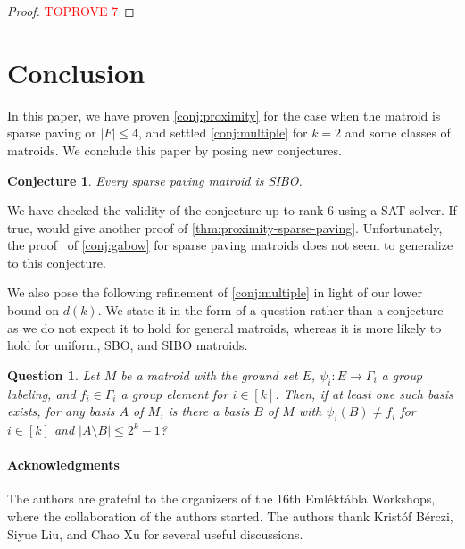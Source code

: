 \documentclass{article}
\newtheorem{conjecture}[theorem]{Conjecture}
\newtheorem{question}[theorem]{Question}
\theoremstyle{definition}
\begin{document}
\begin{proof}\textcolor{red}{TOPROVE 7}\end{proof}


\section{Conclusion}\label{sec:conclusion}

In this paper, we have proven \cref{conj:proximity} for the case when the matroid is sparse paving or $|F| \le 4$, and settled \cref{conj:multiple} for $k = 2$ and some classes of matroids.
We conclude this paper by posing new conjectures.

\begin{conjecture}\label{conj:sparse-paving-is-sibo}
    Every sparse paving matroid is SIBO.
\end{conjecture}

We have checked the validity of the conjecture up to rank 6 using a SAT solver.
If true,  would give another proof of \cref{thm:proximity-sparse-paving}.
Unfortunately, the proof~\cite{bonin2013basis} of \cref{conj:gabow} for sparse paving matroids does not seem to generalize to this conjecture. 



We also pose the following refinement of \cref{conj:multiple} in light of our lower bound on $d(k)$.
We state it in the form of a question rather than a conjecture as we do not expect it to hold for general matroids, whereas it is more likely to hold for uniform, SBO, and SIBO matroids.

\begin{question}\label{conj:quantative-multiple}
    Let $M$ be a matroid with the ground set $E$, $\psi_i \colon E \to \Gamma_i$ a group labeling, and $f_i \in \Gamma_i$ a group element for $i \in [k]$.
    Then, if at least one such basis exists, for any basis $A$ of $M$, is there a basis $B$ of $M$ with $\psi_i(B) \ne f_i$ for $i \in [k]$ and $|A\setminus B| \le 2^k - 1$? 
\end{question}

\paragraph{Acknowledgments}
The authors are grateful to the organizers of the 16th Emléktábla Workshops, where the collaboration of the authors started.
The authors thank Kristóf Bérczi, Siyue Liu, and Chao Xu for several useful discussions.
\end{document}
